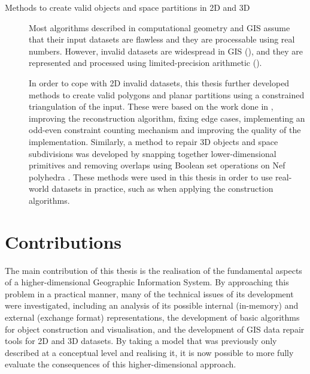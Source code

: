 \begin{description}

\item[Methods to create valid objects and space partitions in 2D and 3D]

Most algorithms described in computational geometry and GIS assume that their input datasets are flawless and they are processable using real numbers.
However, invalid datasets are widespread in GIS (), and they are represented and processed using limited-precision arithmetic ().

In order to cope with 2D invalid datasets, this thesis further developed methods to create valid polygons and planar partitions using a constrained triangulation of the input.
These were based on the work done in \citet{ArroyoOhori10}, improving the reconstruction algorithm, fixing edge cases, implementing an odd-even constraint counting mechanism and improving the quality of the implementation.
Similarly, a method to repair 3D objects and space subdivisions was developed by snapping together lower-dimensional primitives and removing overlaps using Boolean set operations on Nef polyhedra \citep{Bieri88,Hachenberger06}.
These methods were used in this thesis in order to use real-world datasets in practice, such as when applying the construction algorithms.


\end{description}

\section{Contributions}
\label{se:contributions}

The main contribution of this thesis is the realisation of the fundamental aspects of a higher-dimensional Geographic Information System.
By approaching this problem in a practical manner, many of the technical issues of its development were investigated, including an analysis of its possible internal (in-memory) and external (exchange format) representations, the development of basic algorithms for object construction and visualisation, and the development of GIS data repair tools for 2D and 3D datasets.
By taking a model that was previously only described at a conceptual level \citep{vanOosterom10} and realising it, it is now possible to more fully evaluate the consequences of this higher-dimensional approach.

